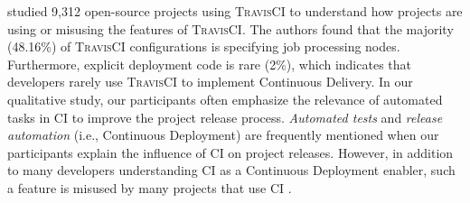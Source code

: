 \cite{gallaba2018use} studied 9,312 open-source projects using \textsc{TravisCI} to understand how projects are using or misusing the features of \textsc{TravisCI}. The authors found that the majority (48.16\%) of \textsc{TravisCI} configurations is specifying job processing nodes. Furthermore, explicit deployment code is rare (2\%), which indicates that developers rarely use \textsc{TravisCI} to implement Continuous Delivery. In our qualitative study,  our participants often emphasize the relevance of automated tasks in CI to improve the project release process. \textit{Automated tests} and \textit{release automation} (i.e., Continuous Deployment) are frequently mentioned when our participants explain the influence of CI on project releases. However, in addition to many developers understanding CI as a Continuous Deployment enabler, such a feature is misused by many projects that use CI \citep{gallaba2018use}.

